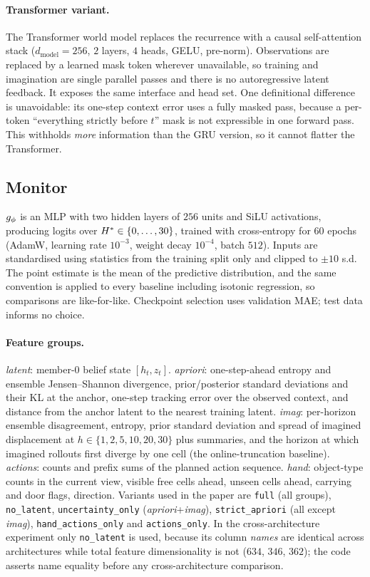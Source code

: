 \paragraph{Transformer variant.} The Transformer world model replaces the recurrence with a
causal self-attention stack \citep{vaswani2017attention} ($d_{\text{model}} = 256$, $2$ layers, $4$ heads, GELU,
pre-norm). Observations are replaced by a learned mask token wherever unavailable, so training
and imagination are single parallel passes and there is no autoregressive latent feedback. It
exposes the same interface and head set. One definitional difference is unavoidable: its
one-step context error uses a fully masked pass, because a per-token ``everything strictly
before $t$'' mask is not expressible in one forward pass. This withholds \emph{more}
information than the GRU version, so it cannot flatter the Transformer.

\subsection{Monitor}

$g_{\phi}$ is an MLP with two hidden layers of $256$ units and SiLU activations, producing logits
over $H^{*} \in \{0,\dots,30\}$, trained with cross-entropy for $60$ epochs (AdamW, learning
rate $10^{-3}$, weight decay $10^{-4}$, batch $512$). Inputs are standardised using statistics
from the training split only and clipped to $\pm 10$ s.d. The point estimate is the mean of the
predictive distribution, and the same convention is applied to every baseline including
isotonic regression, so comparisons are like-for-like. Checkpoint selection uses validation
MAE; test data informs no choice.

\paragraph{Feature groups.} \emph{latent}: member-0 belief state $[h_t, z_t]$. \emph{apriori}:
one-step-ahead entropy and ensemble Jensen--Shannon divergence, prior/posterior standard
deviations and their KL at the anchor, one-step tracking error over the observed context, and
distance from the anchor latent to the nearest training latent. \emph{imag}: per-horizon
ensemble disagreement, entropy, prior standard deviation and spread of imagined displacement at
$h \in \{1,2,5,10,20,30\}$ plus summaries, and the horizon at which imagined rollouts first
diverge by one cell (the online-truncation baseline). \emph{actions}: counts and prefix sums of
the planned action sequence. \emph{hand}: object-type counts in the current view, visible free
cells ahead, unseen cells ahead, carrying and door flags, direction. Variants used in the paper
are \texttt{full} (all groups), \texttt{no\_latent}, \texttt{uncertainty\_only}
(\emph{apriori}+\emph{imag}), \texttt{strict\_apriori} (all except \emph{imag}),
\texttt{hand\_actions\_only} and \texttt{actions\_only}. In the cross-architecture experiment
only \texttt{no\_latent} is used, because its column \emph{names} are identical across
architectures while total feature dimensionality is not ($634$, $346$, $362$); the code asserts
name equality before any cross-architecture comparison.

